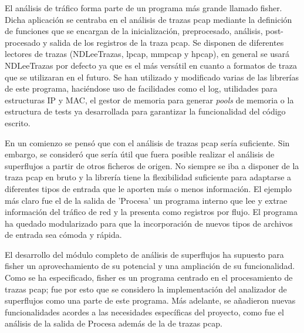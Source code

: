 \documentclass[twoside, 12pt]{epstfg}
\begin{document}
El análisis de tráfico forma parte de un programa más grande llamado fisher. Dicha aplicación se centraba en el análisis de trazas pcap mediante la definición de funciones que se encargan de la inicialización, preprocesado, análisis, post-procesado y salida de los registros de la traza pcap. Se disponen de diferentes lectores de trazas (NDLeeTrazas, lpcap, mmpcap y hpcap), en general se usará NDLeeTrazas por defecto ya que es el más versátil en cuanto a formatos de traza que se utilizaran en el futuro. 
Se han utilizado y modificado varias de las librerías de este programa, haciéndose uso de facilidades como el log, utilidades para estructuras IP y MAC, el gestor de memoria para generar \textit{pools} de memoria o la estructura de tests ya desarrollada para garantizar la funcionalidad del código escrito.

En un comienzo se pensó que con el análisis de trazas pcap sería suficiente. Sin embargo, se consideró que sería útil que fuera posible realizar el análisis de superflujos a partir de otros ficheros de origen. No siempre se iba a disponer de la traza pcap en bruto y la librería tiene la flexibilidad suficiente para adaptarse a diferentes tipos de entrada que le aporten más o menos información. El ejemplo más claro fue el de la salida de 'Procesa' un programa interno que lee y extrae información del tráfico de red y la presenta como registros por flujo. El programa ha quedado modularizado para que la incorporación de nuevos tipos de archivos de entrada sea cómoda y rápida.

El desarrollo del módulo completo de análisis de superflujos ha supuesto para fisher un aprovechamiento de su potencial y una ampliación de su funcionalidad. Como se ha especificado, fisher es un programa centrado en el procesamiento de trazas pcap; fue por esto que se considero la implementación del analizador de superflujos como una parte de este programa. Más adelante, se añadieron nuevas funcionalidades acordes a las necesidades específicas del proyecto, como fue el análisis de la salida de Procesa además de la de trazas pcap.

\end{document}
